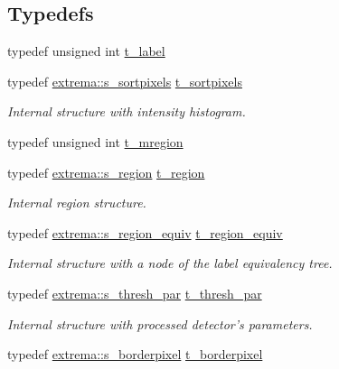 \subsection*{Typedefs}
\begin{CompactItemize}
\item 
typedef unsigned int \hyperlink{namespaceextrema_480109603acd8a50e1dc4e7fa8a08aa6}{t\_\-label}
\item 
typedef \hyperlink{structextrema_1_1s__sortpixels}{extrema::s\_\-sortpixels} \hyperlink{namespaceextrema_fe82307c3b119c3da09a001341fa3560}{t\_\-sortpixels}
\begin{CompactList}\small\item\em Internal structure with intensity histogram. \item\end{CompactList}\item 
typedef unsigned int \hyperlink{namespaceextrema_478b639d6550cb7f6a38ddebb6be6eef}{t\_\-mregion}
\item 
typedef \hyperlink{structextrema_1_1s__region}{extrema::s\_\-region} \hyperlink{namespaceextrema_69226559b69da898aa092cbdd82db4ac}{t\_\-region}
\begin{CompactList}\small\item\em Internal region structure. \item\end{CompactList}\item 
typedef \hyperlink{structextrema_1_1s__region__equiv}{extrema::s\_\-region\_\-equiv} \hyperlink{namespaceextrema_42db5ac790d7a031f39fabe108eb784d}{t\_\-region\_\-equiv}
\begin{CompactList}\small\item\em Internal structure with a node of the label equivalency tree. \item\end{CompactList}\item 
typedef \hyperlink{structextrema_1_1s__thresh__par}{extrema::s\_\-thresh\_\-par} \hyperlink{namespaceextrema_86995a754292e8ace3b0fc651631fec0}{t\_\-thresh\_\-par}
\begin{CompactList}\small\item\em Internal structure with processed detector's parameters. \item\end{CompactList}\item 
typedef \hyperlink{structextrema_1_1s__borderpixel}{extrema::s\_\-borderpixel} \hyperlink{namespaceextrema_26d3969d4cd15bc77e67e66d7c56d117}{t\_\-borderpixel}

\end{CompactItemize}
